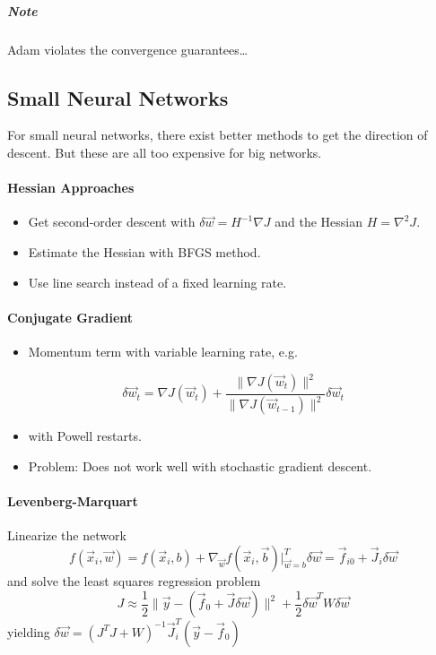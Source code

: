 			\subparagraph{Note}
				Adam violates the convergence guarantees\dots

		\subsection{Small Neural Networks}
			For small neural networks, there exist better methods to get the direction of descent. But these are all too expensive for big networks.

			\paragraph{Hessian Approaches}
				\begin{itemize}
					\item Get second-order descent with \( \delta\vec{w} = H^{-1} \nabla J \) and the Hessian \( H = \nabla^2 J \).
					\item Estimate the Hessian with BFGS method.
					\item Use line search instead of a fixed learning rate.
				\end{itemize}

			\paragraph{Conjugate Gradient}
				\begin{itemize}
					\item Momentum term with variable learning rate, e.g.
				\end{itemize}
				\begin{equation}
					\delta\vec{w}_t = \nabla J(\vec{w}_t) + \frac{\lVert \nabla J(\vec{w}_t) \rVert ^2}{\lVert \nabla J(\vec{w}_{t - 1}) \rVert^2} \delta\vec{w}_{t}
				\end{equation}
				\begin{itemize}
					\item[] with Powell restarts.
					\item Problem: Does not work well with stochastic gradient descent.
				\end{itemize}

			\paragraph{Levenberg-Marquart}
				Linearize the network
				\begin{equation}
					f(\vec{x}_i, \vec{w}) = f(\vec{x}_i, b) + \nabla_{\vec{w}} f(\vec{x}_i, \vec{b}) \big\vert_{\vec{w} = b}^T \delta\vec{w} = \vec{f}_{i0} + \vec{J}_i \delta\vec{w}
				\end{equation}
				and solve the least squares regression problem
				\begin{equation}
					J \approx \frac{1}{2} \lVert \vec{y} - (\vec{f}_0 + \vec{J} \delta\vec{w}) \rVert^2 + \frac{1}{2} \delta\vec{w}^T W \delta\vec{w}
				\end{equation}
				yielding \( \delta\vec{w} = (J^T J + W)^{-1} \vec{J}_i^T (\vec{y} - \vec{f}_0) \)

